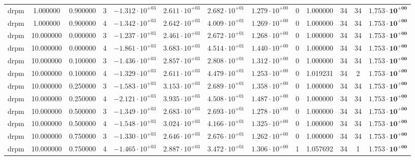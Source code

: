 \begin{table}
\begin{tabular}{ccccccccccccc}
drpm & 1.000000 & 0.900000 & 3 & $-1.312 \cdot 10^{+03}$ & $2.611 \cdot 10^{+03}$ & $2.682 \cdot 10^{+01}$ & $1.279 \cdot 10^{+00}$ & 0 & 1.000000 & 34 & 34 & $\mathbf{1.753 \cdot 10^{+00}}$ \\
drpm & 1.000000 & 0.900000 & 4 & $-1.342 \cdot 10^{+03}$ & $2.642 \cdot 10^{+03}$ & $4.009 \cdot 10^{+01}$ & $1.269 \cdot 10^{+00}$ & 0 & 1.000000 & 34 & 34 & $\mathbf{1.753 \cdot 10^{+00}}$ \\
drpm & 10.000000 & 0.000000 & 3 & $-1.237 \cdot 10^{+03}$ & $2.461 \cdot 10^{+03}$ & $2.672 \cdot 10^{+01}$ & $1.268 \cdot 10^{+00}$ & 0 & 1.000000 & 34 & 34 & $\mathbf{1.753 \cdot 10^{+00}}$ \\
drpm & 10.000000 & 0.000000 & 4 & $-1.861 \cdot 10^{+03}$ & $3.683 \cdot 10^{+03}$ & $4.514 \cdot 10^{+01}$ & $1.440 \cdot 10^{+00}$ & 0 & 1.000000 & 34 & 34 & $\mathbf{1.753 \cdot 10^{+00}}$ \\
drpm & 10.000000 & 0.100000 & 3 & $-1.436 \cdot 10^{+03}$ & $2.857 \cdot 10^{+03}$ & $2.808 \cdot 10^{+01}$ & $1.312 \cdot 10^{+00}$ & 0 & 1.000000 & 34 & 34 & $\mathbf{1.753 \cdot 10^{+00}}$ \\
drpm & 10.000000 & 0.100000 & 4 & $-1.329 \cdot 10^{+03}$ & $2.611 \cdot 10^{+03}$ & $4.479 \cdot 10^{+01}$ & $1.253 \cdot 10^{+00}$ & 0 & 1.019231 & 34 & 2 & $\mathbf{1.753 \cdot 10^{+00}}$ \\
drpm & 10.000000 & 0.250000 & 3 & $-1.583 \cdot 10^{+03}$ & $3.153 \cdot 10^{+03}$ & $2.689 \cdot 10^{+01}$ & $1.358 \cdot 10^{+00}$ & 0 & 1.000000 & 34 & 34 & $\mathbf{1.753 \cdot 10^{+00}}$ \\
drpm & 10.000000 & 0.250000 & 4 & $-2.121 \cdot 10^{+03}$ & $3.935 \cdot 10^{+03}$ & $4.508 \cdot 10^{+01}$ & $1.487 \cdot 10^{+00}$ & 0 & 1.000000 & 34 & 34 & $\mathbf{1.753 \cdot 10^{+00}}$ \\
drpm & 10.000000 & 0.500000 & 3 & $-1.349 \cdot 10^{+03}$ & $2.683 \cdot 10^{+03}$ & $2.693 \cdot 10^{+01}$ & $1.278 \cdot 10^{+00}$ & 0 & 1.000000 & 34 & 34 & $\mathbf{1.753 \cdot 10^{+00}}$ \\
drpm & 10.000000 & 0.500000 & 4 & $-1.548 \cdot 10^{+03}$ & $3.024 \cdot 10^{+03}$ & $4.166 \cdot 10^{+01}$ & $1.325 \cdot 10^{+00}$ & 0 & 1.000000 & 34 & 34 & $\mathbf{1.753 \cdot 10^{+00}}$ \\
drpm & 10.000000 & 0.750000 & 3 & $-1.330 \cdot 10^{+03}$ & $2.646 \cdot 10^{+03}$ & $2.676 \cdot 10^{+01}$ & $1.262 \cdot 10^{+00}$ & 0 & 1.000000 & 34 & 34 & $\mathbf{1.753 \cdot 10^{+00}}$ \\
drpm & 10.000000 & 0.750000 & 4 & $-1.465 \cdot 10^{+03}$ & $2.887 \cdot 10^{+03}$ & $3.472 \cdot 10^{+01}$ & $1.306 \cdot 10^{+00}$ & 1 & 1.057692 & 34 & 1 & $\mathbf{1.753 \cdot 10^{+00}}$ \\

\end{tabular}
\end{table}
